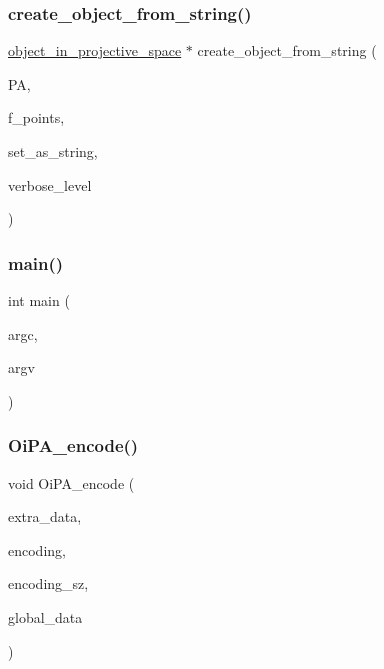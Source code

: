 \subsubsection{\texorpdfstring{create\+\_\+object\+\_\+from\+\_\+string()}{create\_object\_from\_string()}}
{\footnotesize\ttfamily \mbox{\hyperlink{classobject__in__projective__space}{object\+\_\+in\+\_\+projective\+\_\+space}} $\ast$ create\+\_\+object\+\_\+from\+\_\+string (\begin{DoxyParamCaption}\item[{\mbox{\hyperlink{classprojective__space__with__action}{projective\+\_\+space\+\_\+with\+\_\+action}} $\ast$}]{PA,  }\item[{\mbox{\hyperlink{galois_8h_a09fddde158a3a20bd2dcadb609de11dc}{I\+NT}}}]{f\+\_\+points,  }\item[{const \mbox{\hyperlink{galois_8h_ab6cc7b4aeb6ea31aba2b3fbfc83ff5e6}{B\+Y\+TE}} $\ast$}]{set\+\_\+as\+\_\+string,  }\item[{\mbox{\hyperlink{galois_8h_a09fddde158a3a20bd2dcadb609de11dc}{I\+NT}}}]{verbose\+\_\+level }\end{DoxyParamCaption})}

\mbox{\label{projective__space__main_8_c_a3c04138a5bfe5d72780bb7e82a18e627}} 
\subsubsection{\texorpdfstring{main()}{main()}}
{\footnotesize\ttfamily int main (\begin{DoxyParamCaption}\item[{int}]{argc,  }\item[{char $\ast$$\ast$}]{argv }\end{DoxyParamCaption})}

\mbox{\label{projective__space__main_8_c_a7ee717b278a36df7300440bf6de5fcdd}} 
\subsubsection{\texorpdfstring{Oi\+P\+A\+\_\+encode()}{OiPA\_encode()}}
{\footnotesize\ttfamily void Oi\+P\+A\+\_\+encode (\begin{DoxyParamCaption}\item[{void $\ast$}]{extra\+\_\+data,  }\item[{\mbox{\hyperlink{galois_8h_a09fddde158a3a20bd2dcadb609de11dc}{I\+NT}} $\ast$\&}]{encoding,  }\item[{\mbox{\hyperlink{galois_8h_a09fddde158a3a20bd2dcadb609de11dc}{I\+NT}} \&}]{encoding\+\_\+sz,  }\item[{void $\ast$}]{global\+\_\+data }\end{DoxyParamCaption})}

